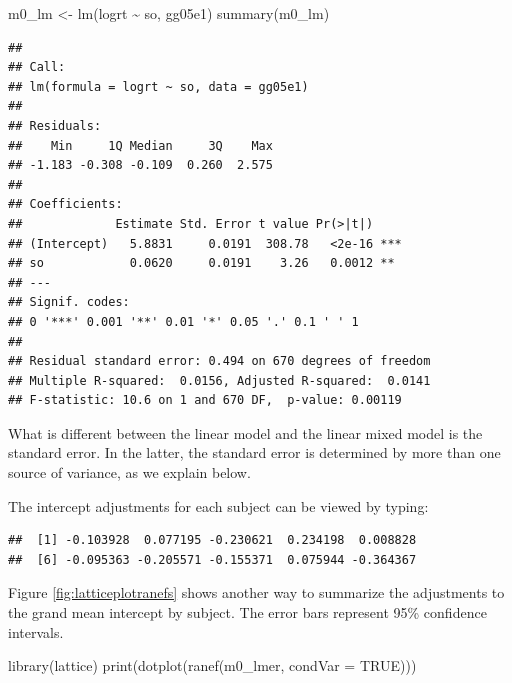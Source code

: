 \documentclass[
  12pt,
]{krantz}
\newenvironment{Shaded}{\begin{snugshade}}{\end{snugshade}}
\newcommand{\AttributeTok}[1]{\textcolor[rgb]{0.77,0.63,0.00}{#1}}
\newcommand{\ConstantTok}[1]{\textcolor[rgb]{0.00,0.00,0.00}{#1}}
\newcommand{\DecValTok}[1]{\textcolor[rgb]{0.00,0.00,0.81}{#1}}
\newcommand{\DocumentationTok}[1]{\textcolor[rgb]{0.56,0.35,0.01}{\textbf{\textit{#1}}}}
\newcommand{\FunctionTok}[1]{\textcolor[rgb]{0.00,0.00,0.00}{#1}}
\newcommand{\NormalTok}[1]{#1}
\newcommand{\OtherTok}[1]{\textcolor[rgb]{0.56,0.35,0.01}{#1}}
\newcommand{\SpecialCharTok}[1]{\textcolor[rgb]{0.00,0.00,0.00}{#1}}
\theoremstyle{definition}
\theoremstyle{definition}
\theoremstyle{definition}
\theoremstyle{definition}
\theoremstyle{remark}
\begin{document}
\begin{Shaded}
\begin{Highlighting}[]
\NormalTok{m0\_lm }\OtherTok{\textless{}{-}} \FunctionTok{lm}\NormalTok{(logrt }\SpecialCharTok{\textasciitilde{}}\NormalTok{ so, gg05e1)}
\FunctionTok{summary}\NormalTok{(m0\_lm)}
\end{Highlighting}
\end{Shaded}

\begin{verbatim}
## 
## Call:
## lm(formula = logrt ~ so, data = gg05e1)
## 
## Residuals:
##    Min     1Q Median     3Q    Max 
## -1.183 -0.308 -0.109  0.260  2.575 
## 
## Coefficients:
##             Estimate Std. Error t value Pr(>|t|)    
## (Intercept)   5.8831     0.0191  308.78   <2e-16 ***
## so            0.0620     0.0191    3.26   0.0012 ** 
## ---
## Signif. codes:  
## 0 '***' 0.001 '**' 0.01 '*' 0.05 '.' 0.1 ' ' 1
## 
## Residual standard error: 0.494 on 670 degrees of freedom
## Multiple R-squared:  0.0156, Adjusted R-squared:  0.0141 
## F-statistic: 10.6 on 1 and 670 DF,  p-value: 0.00119
\end{verbatim}

What is different between the linear model and the linear mixed model is the standard error. In the latter, the standard error is determined by more than one source of variance, as we explain below.

The intercept adjustments for each subject can be viewed by typing:

\begin{Shaded}
\end{Shaded}

\begin{verbatim}
##  [1] -0.103928  0.077195 -0.230621  0.234198  0.008828
##  [6] -0.095363 -0.205571 -0.155371  0.075944 -0.364367
\end{verbatim}

Figure \ref{fig:latticeplotranefs} shows another way to summarize the adjustments to the grand mean intercept by subject. The error bars represent 95\% confidence intervals.

\begin{Shaded}
\begin{Highlighting}[]
\FunctionTok{library}\NormalTok{(lattice)}
\FunctionTok{print}\NormalTok{(}\FunctionTok{dotplot}\NormalTok{(}\FunctionTok{ranef}\NormalTok{(m0\_lmer, }\AttributeTok{condVar =} \ConstantTok{TRUE}\NormalTok{)))}
\end{Highlighting}
\end{Shaded}
\end{document}
